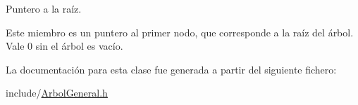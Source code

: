 Puntero a la raíz. 

Este miembro es un puntero al primer nodo, que corresponde a la raíz del árbol. Vale 0 sin el árbol es vacío. 

La documentación para esta clase fue generada a partir del siguiente fichero\-:\begin{DoxyCompactItemize}
\item 
include/\hyperlink{ArbolGeneral_8h}{Arbol\-General.\-h}\end{DoxyCompactItemize}

